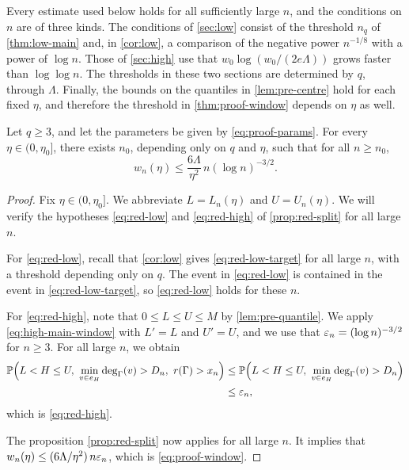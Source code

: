 Every estimate used below holds for all sufficiently large $n$, and the conditions on $n$ are of three kinds. The conditions of \cref{sec:low} consist of the threshold $n_q$ of \cref{thm:low-main} and, in \cref{cor:low}, a comparison of the negative power $n^{-1/8}$ with a power of $\log n$. Those of \cref{sec:high} use that $w_0 \log(w_0 / (2 e \Lambda))$ grows faster than $\log \log n$. The thresholds in these two sections are determined by $q$, through $\Lambda$. Finally, the bounds on the quantiles in \cref{lem:pre-centre} hold for each fixed $\eta$, and therefore the threshold in \cref{thm:proof-window} depends on $\eta$ as well.

\begin{theorem}\label{thm:proof-window}
Let $q \ge 3$, and let the parameters be given by \eqref{eq:proof-params}. For every $\eta \in (0, \eta_0]$, there exists $n_0$, depending only on $q$ and $\eta$, such that for all $n \ge n_0$,
\begin{equation}\label{eq:proof-window}
w_n(\eta) \le \frac{6 \Lambda}{\eta^2} \, n (\log n)^{-3/2}.
\end{equation}
\end{theorem}

\begin{proof}
Fix $\eta \in (0, \eta_0]$. We abbreviate $L = L_n(\eta)$ and $U = U_n(\eta)$. We will verify the hypotheses \eqref{eq:red-low} and \eqref{eq:red-high} of \cref{prop:red-split} for all large $n$.

For \eqref{eq:red-low}, recall that \cref{cor:low} gives \eqref{eq:red-low-target} for all large $n$, with a threshold depending only on $q$. The event in \eqref{eq:red-low} is contained in the event in \eqref{eq:red-low-target}, so \eqref{eq:red-low} holds for these $n$.

For \eqref{eq:red-high}, note that $0 \le L \le U \le M$ by \cref{lem:pre-quantile}. We apply \eqref{eq:high-main-window} with $L' = L$ and $U' = U$, and we use that $\varepsilon_n = (\log n)^{-3/2}$ for $n \ge 3$. For all large $n$, we obtain
\[
\begin{split}
\Pp \Bigl( L < H \le U, \ \min_{v \in e_H} \deg_\Gamma(v) > D_n, \ r(\Gamma) > x_n \Bigr) &\le \Pp \Bigl( L < H \le U, \ \min_{v \in e_H} \deg_\Gamma(v) > D_n \Bigr)\\
&\le \eps_n,
\end{split}
\]
which is \eqref{eq:red-high}.

The proposition \cref{prop:red-split} now applies for all large $n$. It implies that $w_n(\eta) \le (6 \Lambda / \eta^2) \, n \varepsilon_n$, which is \eqref{eq:proof-window}.
\end{proof}

